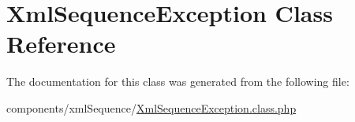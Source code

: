 \hypertarget{class_xml_sequence_exception}{
\section{XmlSequenceException Class Reference}
\label{class_xml_sequence_exception}
}


The documentation for this class was generated from the following file:\begin{CompactItemize}
\item 
components/xmlSequence/\hyperlink{_xml_sequence_exception_8class_8php}{XmlSequenceException.class.php}\end{CompactItemize}

